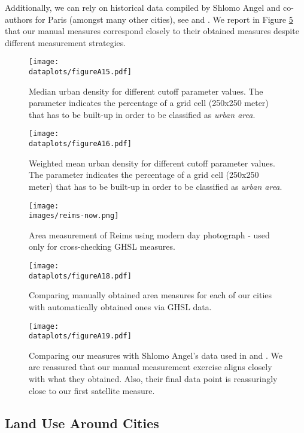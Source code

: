 \documentclass[11pt]{report}
\newcommand{\images}{../data/images}
\newcommand{\dataplots}{../output/data/plots}
\begin{document}
Additionally, we can rely on historical data compiled by Shlomo Angel and co-authors for Paris (amongst many other cities), see \cite{angel2012atlas} and \cite{angel2010persistent}. We 
report in Figure \ref{A-fig:shlomo} that our manual measures correspond closely to their obtained measures despite different measurement strategies. 

\begin{figure}[p]
	\texttt{[image: \\dataplots/figureA15.pdf]}
	\caption{Median urban density for different cutoff parameter values. The parameter indicates the percentage of a grid cell (250x250 meter) that has to be built-up in order to be classified as \emph{urban area}. \label{A-fig:cutoff}}
\end{figure}

\begin{figure}[p]
	\texttt{[image: \\dataplots/figureA16.pdf]}
	\caption{Weighted mean urban density for different cutoff parameter values. The parameter indicates the percentage of a grid cell (250x250 meter) that has to be built-up in order to be classified as \emph{urban area}.\label{A-fig:cutoff-wtd}}
\end{figure}



\begin{figure}
	\centering
	\texttt{[image: \\images/reims-now.png]}
	\caption{Area measurement of Reims using modern day photograph - used only for cross-checking GHSL measures.\label{A-fig:Reims-now}}
\end{figure}


\begin{figure}
	\texttt{[image: \\dataplots/figureA18.pdf]}
	\caption{Comparing manually obtained area measures for each of our cities with automatically obtained ones via GHSL data.\label{A-fig:manual-vs-satellite}}
\end{figure}

\begin{figure}
	\texttt{[image: \\dataplots/figureA19.pdf]}
	\caption{Comparing our measures with Shlomo Angel's data used in \cite{angel2012atlas} and \cite{angel2010persistent}. We are reassured that our manual measurement exercise aligns closely with what they obtained. Also, their final data point is reassuringly close to our first satellite measure.\label{A-fig:shlomo}}
\end{figure}


\pagebreak
\subsection{Land Use Around Cities}\label{A-sec:CLC}
\end{document}
